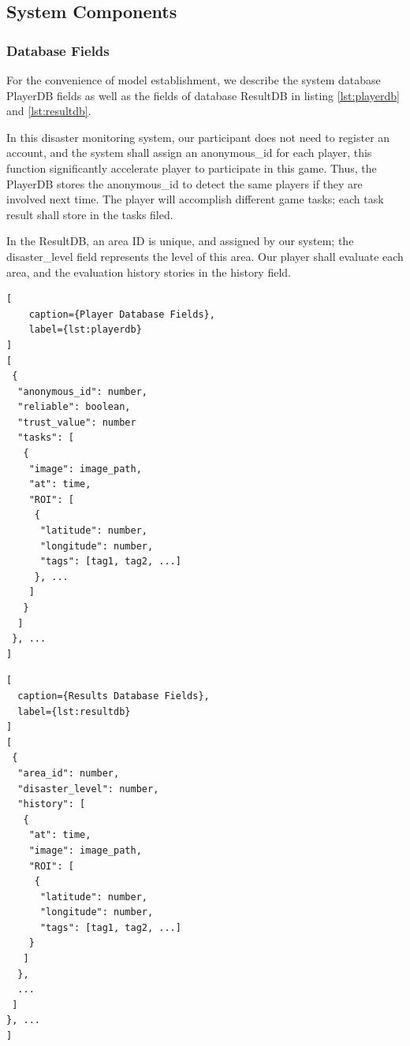 \subsection{System Components}

\subsubsection{Database Fields}

For the convenience of model establishment, we describe the system database PlayerDB 
fields as well as the fields of database ResultDB in listing \ref{lst:playerdb}
and \ref{lst:resultdb}.

In this disaster monitoring system, our participant does not need to register an account,
and the system shall assign an anonymous\_id for each player, this function significantly 
accelerate player to participate in this game. Thus, the PlayerDB stores the anonymous\_id
to detect the same players if they are involved next time. The player will accomplish different
game tasks; each task result shall store in the tasks filed.

In the ResultDB, an area ID is unique, and assigned by our system; the disaster\_level field
represents the level of this area. Our player shall evaluate each area, and the evaluation
history stories in the history field.


\noindent\begin{minipage}{.45\textwidth}
\begin{lstlisting}[
    caption={Player Database Fields},
    label={lst:playerdb}
]
[
 {
  "anonymous_id": number,
  "reliable": boolean,
  "trust_value": number
  "tasks": [
   {
    "image": image_path,
    "at": time, 
    "ROI": [
     {
      "latitude": number,
      "longitude": number,
      "tags": [tag1, tag2, ...]
     }, ...
    ]
   }
  ]
 }, ...
]
\end{lstlisting}
\end{minipage}\hfill
\begin{minipage}{.45\textwidth}
\begin{lstlisting}[
  caption={Results Database Fields},
  label={lst:resultdb}
]
[
 {
  "area_id": number,
  "disaster_level": number,
  "history": [
   {
    "at": time,
    "image": image_path,
    "ROI": [
     {
      "latitude": number,
      "longitude": number,
      "tags": [tag1, tag2, ...]
    }
   ]
  }, 
  ...
 ]
}, ...
]
\end{lstlisting}
\end{minipage}

